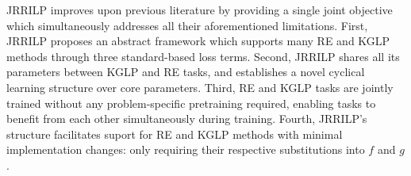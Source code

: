 
JRRILP improves upon previous literature by providing a single joint objective which simultaneously addresses all their aforementioned limitations. First, JRRILP proposes an abstract framework which supports many RE and KGLP methods through three standard-based loss terms. Second, JRRILP shares all its parameters between KGLP and RE tasks, and establishes a novel cyclical learning structure over core parameters. Third, RE and KGLP tasks are jointly trained without any problem-specific pretraining required, enabling tasks to benefit from each other simultaneously during training. Fourth, JRRILP's structure facilitates suport for RE and KGLP methods with minimal implementation changes: only requiring their respective substitutions into $f$ and $g$.



